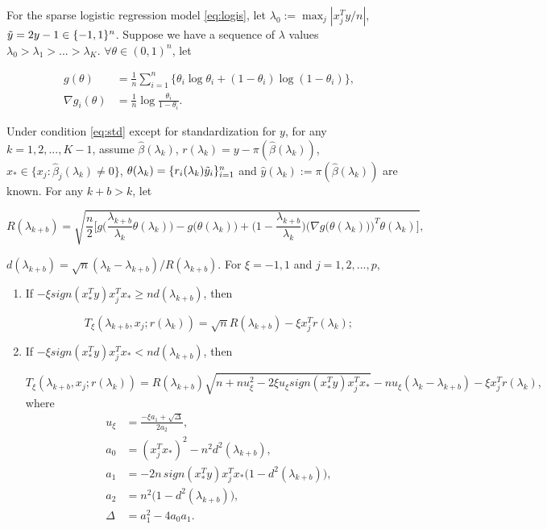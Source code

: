 \begin{theorem}
For the sparse logistic regression model \eqref{eq:logis}, let $\lambda_0:=\max_j|x_j^Ty/n|$, $\Tilde{y}=2y-1\in\{-1,1\}^n$. Suppose we have a sequence of $\lambda$ values $\lambda_0>\lambda_1>...>\lambda_K$. $\forall\theta\in(0,1)^n$, let 

\begin{equation}
    \begin{split}
        g(\theta)&=\frac{1}{n}\sum_{i=1}^n\{\theta_i\log \theta_i+(1-\theta_i)\log(1-\theta_i)\},\\
    \nabla g_i(\theta) &= \frac{1}{n}\log\frac{\theta_i}{1-\theta_i}.
    \end{split}
\end{equation}

Under condition \eqref{eq:std} except for standardization for $y$, for any $k=1,2,...,K-1$, assume $\hat{\beta}(\lambda_k)$, $r(\lambda_k)=y-\pi(\hat{\beta}(\lambda_k))$, $x_*\in\{x_j:\hat{\beta}_j(\lambda_k)\neq0\} $, $\theta(\lambda_k)=\{r_i(\lambda_k)\Tilde{y}_i\}_{i=1}^n$ and $\hat{y}(\lambda_k):=\pi(\hat{\beta}(\lambda_k))$ are known. For any $k+b>k$, let

\begin{equation}
    R(\lambda_{k+b})=\sqrt{\frac{n}{2}\bigg[g\bigg(\frac{\lambda_{k+b}}{\lambda_k}\theta(\lambda_k)\bigg)-g\bigg(\theta(\lambda_k)\bigg)+\bigg(1-\frac{\lambda_{k+b}}{\lambda_k}\bigg)\bigg(\nabla g\big(\theta(\lambda_k)\big)\bigg)^T\theta(\lambda_k)\bigg]},
\end{equation}

$d(\lambda_{k+b})=\sqrt{n}(\lambda_k-\lambda_{k+b})/R(\lambda_{k+b})$. For $\xi = -1,1$ and $j=1,2,...,p$,

\begin{enumerate}
    \item If $-\xi sign(x_*^Ty)x_j^Tx_*\geq nd(\lambda_{k+b})$, then
    
    \begin{equation}
        T_\xi(\lambda_{k+b},x_j;r(\lambda_k))=\sqrt{n}R(\lambda_{k+b})-\xi x_j^Tr(\lambda_k);
    \end{equation}
    
    \item If $-\xi sign(x_*^Ty)x_j^Tx_*< nd(\lambda_{k+b})$, then
    
    \begin{equation}
        T_\xi(\lambda_{k+b},x_j;r(\lambda_k))=R(\lambda_{k+b})\sqrt{n+nu_\xi^2-2\xi u_\xi sign(x_*^Ty)x_j^Tx_*}-nu_\xi(\lambda_k-\lambda_{k+b})-\xi x_j^Tr(\lambda_k),
    \end{equation}
    where
    \begin{align}
        u_\xi&=\frac{-\xi a_1+\sqrt{\Delta}}{2a_2},\\
        a_0&=(x_j^Tx_*)^2-n^2d^2(\lambda_{k+b}),\nonumber\\
        a_1&=-2n\,sign(x_*^Ty)x_j^Tx_*\big(1-d^2(\lambda_{k+b})\big),\nonumber\\
        a_2&=n^2\big(1-d^2(\lambda_{k+b})\big),\nonumber\\
        \Delta&=a_1^2-4a_0a_1.\nonumber
    \end{align}
\end{enumerate}


\end{theorem}
